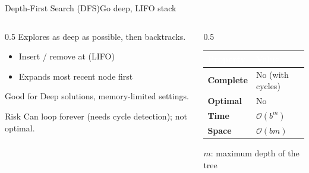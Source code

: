 \documentclass[aspectratio=169,11pt]{beamer}
\begin{document}
\begin{frame}{Depth-First Search (DFS)}{Go deep, LIFO stack}
  \begin{columns}[T]
    \begin{column}{0.5\textwidth}
      Explores as deep as possible, then backtracks.
      \begin{itemize}\small
        \item Insert / remove at  (LIFO)
        \item Expands most recent node first
      \end{itemize}
      \begin{exampleblock}{Good for}
        \small Deep solutions, memory-limited settings.
      \end{exampleblock}
      \begin{alertblock}{Risk}
        \small Can loop forever (needs cycle detection); not optimal.
      \end{alertblock}
    \end{column}
    \begin{column}{0.5\textwidth}
      \small
      \renewcommand{\arraystretch}{1.3}
      \begin{tabularx}{\linewidth}{@{}>{\bfseries}l >{\raggedright\arraybackslash}X@{}}
        \toprule
        \rowcolor{PrimaryDark}
        \textcolor{white}{Property} & \textcolor{white}{Value} \\
        \midrule
        Complete & No (with cycles) \\
        \rowcolor{PrimaryLight!25}
        Optimal & No \\
        Time & $\mathcal{O}(b^{m})$ \\
        \rowcolor{PrimaryLight!25}
        Space & $\mathcal{O}(bm)$ \\
        \bottomrule
      \end{tabularx}
      \vspace{0.4em}
      \centering\scriptsize $m$: maximum depth of the tree
    \end{column}
  \end{columns}
\end{frame}
\end{document}
